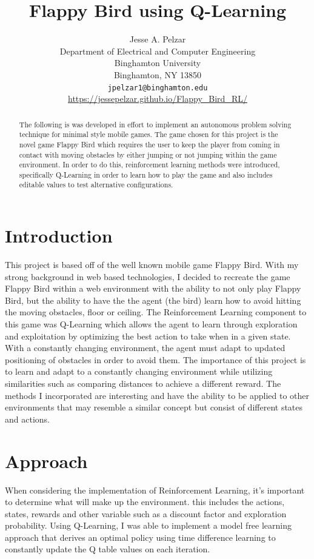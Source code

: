 \documentclass{article}
\title{Flappy Bird using Q-Learning}
\author{%
  Jesse A. Pelzar\\
  Department of Electrical and Computer Engineering\\
  Binghamton University\\
  Binghamton, NY 13850\\
  \texttt{jpelzar1@binghamton.edu} \\
  \url{https://jessepelzar.github.io/Flappy_Bird_RL/}
}
\begin{document}
\maketitle

\begin{abstract}
  The following is was developed in effort to implement an autonomous problem solving technique for minimal style mobile games. The game chosen for this project is the novel game Flappy Bird which requires the user to keep the player from coming in contact with moving obstacles by either jumping or not jumping within the game environment.  In order to do this, reinforcement learning methods were introduced, specifically Q-Learning in order to learn how to play the game and also includes editable values to test alternative configurations. 
\end{abstract}

\section{Introduction}

This project is based off of the well known mobile game Flappy Bird. With my strong background in web based technologies, I decided to recreate the game Flappy Bird within a web environment with the ability to not only play Flappy Bird, but the ability to have the the agent (the bird) learn how to avoid hitting the moving obstacles, floor or ceiling. The Reinforcement Learning component to this game was Q-Learning which allows the agent to learn through exploration and exploitation by optimizing the best action to take when in a given state. With a constantly changing environment, the agent must adapt to updated positioning of obstacles in order to avoid them. The importance of this project is to learn and adapt to a constantly changing environment while utilizing similarities such as comparing distances to achieve a different reward. The methods I incorporated are interesting and have the ability to be applied to other environments that may resemble a similar concept but consist of different states and actions.  

\section{Approach}

When considering the implementation of Reinforcement Learning, it's important to  determine what will make up the environment. this includes the actions, states, rewards and other variable such as a discount factor and exploration probability. Using Q-Learning, I was able to implement a model free learning approach that derives an optimal policy using time difference learning to constantly update the Q table values on each iteration. 
\end{document}
